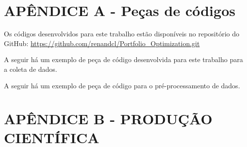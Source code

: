 \appendix

    \section*{APÊNDICE A - Peças de códigos}
        
        \ipar Os códigos desenvolvidos para este trabalho estão disponíveis no repositório do GitHub: \url{https://github.com/renandcl/Portfolio_Optimization.git}

        \ipar A seguir há um exemplo de peça de código desenvolvida para este trabalho para a coleta de dados.

        

        \ipar A seguir há um exemplo de peça de código para o pré-processamento de dados.

        

    \pagebreak
    
    \section*{APÊNDICE B - PRODUÇÃO CIENTÍFICA}
        
